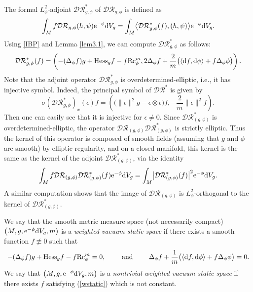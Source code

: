 \documentclass[pdftex]{sigma}
\numberwithin{equation}{section}
\begin{document}
The formal $L^2_\phi$-adjoint $\mathcal{DR}_{g,\phi}^*$ of $\mathcal{DR}_{g,\phi}$ is defined as
\[
\int_M f \mathcal{DR}_{g,\phi}(h,\psi) {\rm e}^{-\phi}{\rm d}V_g=\int_M \bigl\langle \mathcal{DR}_{g,\phi}^*(f), (h,\psi)\bigr\rangle {\rm e}^{-\phi}{\rm d}V_g.
\]
Using \eqref{IBP} and Lemma \ref{lem3.1}, we can compute $\mathcal{DR}_{g,\phi}^*$ as follows:
\begin{equation*}%
 \begin{split}
 \mathcal{DR}^*_{g,\phi}(f)=\left(-(\Delta_\phi f)g+{\rm Hess}_gf-f{\rm Rc}_\phi^m,2\Delta_\phi f+\frac{2}{m}\bigl(\langle {\rm d}f,{\rm d}\phi\rangle+f\Delta_\phi\phi\bigr)\right).
 \end{split}
\end{equation*}
Note that the adjoint operator $\mathcal{DR}_{g,\phi}^*$ is overdetermined-elliptic, i.e., it has injective symbol. Indeed, the principal symbol of $\mathcal{DR}^*$ is given by
\begin{equation*}
 \sigma(\mathcal{DR}_{g,\phi}^*)_x(\epsilon)f=\left(\bigl(\|\epsilon\|^2g-\epsilon\otimes \epsilon\bigr)f,-\frac{2}{m}\|\epsilon\|^2f\right).
\end{equation*}
Then one can easily see that it is injective for $\epsilon\neq0$. Since $\mathcal{DR}_{(g,\phi)}^*$ is overdetermined-elliptic, the operator $\mathcal{DR}_{(g,\phi)}\mathcal{DR}^*_{(g,\phi)}$ is strictly elliptic. Thus the kernel of this operator is composed of smooth fields (assuming that $g$ and $\phi$ are smooth) by elliptic regularity, and on a closed manifold, this kernel is the same as the kernel of the adjoint $\mathcal{DR}_{(g,\phi)}^*$, via the identity
\[
\int_M f\mathcal{DR}_{(g,\phi)}\mathcal{DR}_{(g,\phi)}^*(f){\rm e}^{-\phi}{\rm d}V_g=\int_M \bigl|\mathcal{DR}_{(g,\phi)}^*(f)\bigr|^2{\rm e}^{-\phi}{\rm d}V_g.
\]
 A similar computation shows that the image of $\mathcal{DR}_{(g,\phi)}$ is $L^2_\phi$-orthogonal to the kernel of $\mathcal{DR}_{(g,\phi)}^*$.

\begin{Definition}\label{def_wstatic}
We say that the smooth metric measure space (not necessarily compact) $\bigl(M,g,{\rm e}^{-\phi}{\rm d}V_g,m\bigr)$ is a \textit{weighted vacuum static space} if there exists a smooth function $f\not\equiv 0$ such that
\begin{equation}\label{wstatic}
 -(\Delta_\phi f)g+{\rm Hess}_gf-f{\rm Rc}_\phi^m=0,\qquad\textrm{ and } \qquad \Delta_\phi f+\frac{1}{m}\bigl(\langle {\rm d}f,{\rm d}\phi\rangle+f\Delta_\phi\phi\bigr)=0.
\end{equation}
We say that $\bigl(M,g,{\rm e}^{-\phi}{\rm d}V_g,m\bigr)$ is a \textit{nontrivial weighted vacuum static space}
if there exists $f$ satisfying (\ref{wstatic}) which is not constant.
\end{Definition}
\end{document}
